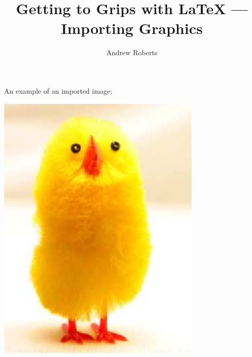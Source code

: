 \documentclass[english]{article}
\begin{document}
\title{Getting to Grips with \LaTeX{} --- Importing Graphics}
\author{Andrew Roberts}
\maketitle

An example of an imported image:

\begin{center}
  \includegraphics{chick-img.png}
\end{center}
\end{document}
